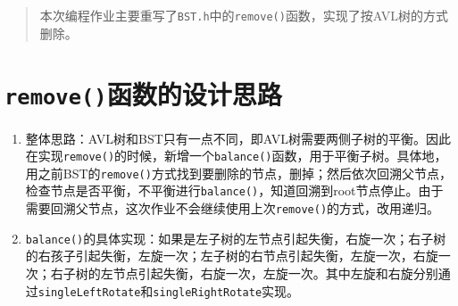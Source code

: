 \documentclass[UTF8]{ctexart}
\begin{document}
\pagestyle{fancy}
\fancyhead{}
\rhead{\today}
\begin{abstract}
	本次编程作业主要重写了\texttt{BST.h}中的\texttt{remove()}函数，实现了按AVL树的方式删除。
\end{abstract}
\section{\texttt{remove()}函数的设计思路}
\begin{enumerate}
	\item
	整体思路：AVL树和BST只有一点不同，即AVL树需要两侧子树的平衡。因此在实现\texttt{remove()}的时候，新增一个\texttt{balance()}函数，用于平衡子树。具体地，用之前BST的\texttt{remove()}方式找到要删除的节点，删掉；然后依次回溯父节点，检查节点是否平衡，不平衡进行\texttt{balance()}，知道回溯到root节点停止。由于需要回溯父节点，这次作业不会继续使用上次\texttt{remove()}的方式，改用递归。
	\item 
	\texttt{balance()}的具体实现：如果是左子树的左节点引起失衡，右旋一次；右子树的右孩子引起失衡，左旋一次；左子树的右节点引起失衡，左旋一次，右旋一次；右子树的左节点引起失衡，右旋一次，左旋一次。其中左旋和右旋分别通过\texttt{singleLeftRotate}和\texttt{singleRightRotate}实现。
\end{enumerate}
\end{document}
